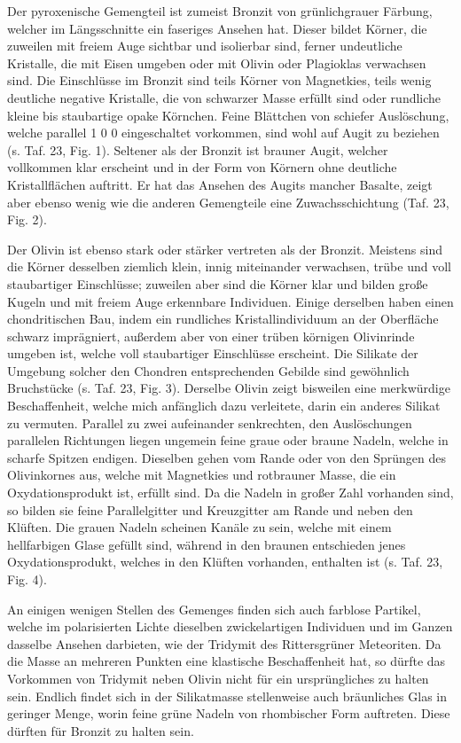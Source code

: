\documentclass[a4paper, 12pt, oneside]{article}
\begin{document}
Der pyroxenische Gemengteil ist zumeist Bronzit von grünlichgrauer Färbung, welcher im Längsschnitte ein faseriges Ansehen hat. Dieser bildet Körner, die zuweilen mit freiem Auge sichtbar und isolierbar sind, ferner undeutliche Kristalle, die mit Eisen umgeben oder mit Olivin oder Plagioklas verwachsen sind. Die Einschlüsse im Bronzit sind teils Körner von Magnetkies, teils wenig deutliche negative Kristalle, die von schwarzer Masse erfüllt sind oder rundliche kleine bis staubartige opake Körnchen. Feine Blättchen von schiefer Auslöschung, welche parallel 1 0 0 eingeschaltet vorkommen, sind wohl auf Augit zu beziehen (s. Taf. 23, Fig. 1). Seltener als der Bronzit ist brauner Augit, welcher vollkommen klar erscheint und in der Form von Körnern ohne deutliche Kristallflächen auftritt. Er hat das Ansehen des Augits mancher Basalte, zeigt aber ebenso wenig wie die anderen Gemengteile eine Zuwachsschichtung (Taf. 23, Fig. 2).

Der Olivin ist ebenso stark oder stärker vertreten als der Bronzit. Meistens sind die Körner desselben ziemlich klein, innig miteinander verwachsen, trübe und voll staubartiger Einschlüsse; zuweilen aber sind die Körner klar und bilden große Kugeln und mit freiem Auge erkennbare Individuen. Einige derselben haben einen chondritischen Bau, indem ein rundliches Kristallindividuum an der Oberfläche schwarz imprägniert, außerdem aber von einer trüben körnigen Olivinrinde umgeben ist, welche voll staubartiger Einschlüsse erscheint. Die Silikate der Umgebung solcher den Chondren entsprechenden Gebilde sind gewöhnlich Bruchstücke (s. Taf. 23, Fig. 3). Derselbe Olivin zeigt bisweilen eine merkwürdige Beschaffenheit, welche mich anfänglich dazu verleitete, darin ein anderes Silikat zu vermuten. Parallel zu zwei aufeinander senkrechten, den Auslöschungen parallelen Richtungen liegen ungemein feine graue oder braune Nadeln, welche in scharfe Spitzen endigen. Dieselben gehen vom Rande oder von den Sprüngen des Olivinkornes aus, welche mit Magnetkies und rotbrauner Masse, die ein Oxydationsprodukt ist, erfüllt sind. Da die Nadeln in großer Zahl vorhanden sind, so bilden sie feine Parallelgitter und Kreuzgitter am Rande und neben den Klüften. Die grauen Nadeln scheinen Kanäle zu sein, welche mit einem hellfarbigen Glase gefüllt sind, während in den braunen entschieden jenes Oxydationsprodukt, welches in den Klüften vorhanden, enthalten ist (s. Taf. 23, Fig. 4).

An einigen wenigen Stellen des Gemenges finden sich auch farblose Partikel, welche im polarisierten Lichte dieselben zwickelartigen Individuen und im Ganzen dasselbe Ansehen darbieten, wie der Tridymit des Rittersgrüner Meteoriten. Da die Masse an mehreren Punkten eine klastische Beschaffenheit hat, so dürfte das Vorkommen von Tridymit neben Olivin nicht für ein ursprüngliches zu halten sein. Endlich findet sich in der Silikatmasse stellenweise auch bräunliches Glas in geringer Menge, worin feine grüne Nadeln von rhombischer Form auftreten. Diese dürften für Bronzit zu halten sein.
\end{document}
